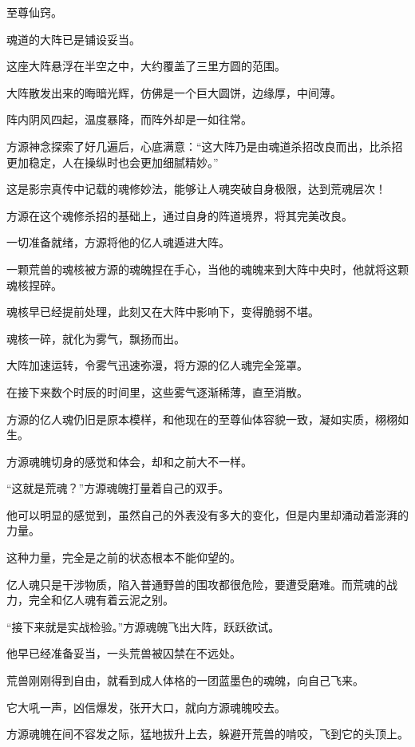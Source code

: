 
\begin{this_body}

至尊仙窍。

魂道的大阵已是铺设妥当。

这座大阵悬浮在半空之中，大约覆盖了三里方圆的范围。

大阵散发出来的晦暗光辉，仿佛是一个巨大圆饼，边缘厚，中间薄。

阵内阴风四起，温度暴降，而阵外却是一如往常。

方源神念探索了好几遍后，心底满意：“这大阵乃是由魂道杀招改良而出，比杀招更加稳定，人在操纵时也会更加细腻精妙。”

这是影宗真传中记载的魂修妙法，能够让人魂突破自身极限，达到荒魂层次！

方源在这个魂修杀招的基础上，通过自身的阵道境界，将其完美改良。

一切准备就绪，方源将他的亿人魂遁进大阵。

一颗荒兽的魂核被方源的魂魄捏在手心，当他的魂魄来到大阵中央时，他就将这颗魂核捏碎。

魂核早已经提前处理，此刻又在大阵中影响下，变得脆弱不堪。

魂核一碎，就化为雾气，飘扬而出。

大阵加速运转，令雾气迅速弥漫，将方源的亿人魂完全笼罩。

在接下来数个时辰的时间里，这些雾气逐渐稀薄，直至消散。

方源的亿人魂仍旧是原本模样，和他现在的至尊仙体容貌一致，凝如实质，栩栩如生。

方源魂魄切身的感觉和体会，却和之前大不一样。

“这就是荒魂？”方源魂魄打量着自己的双手。

他可以明显的感觉到，虽然自己的外表没有多大的变化，但是内里却涌动着澎湃的力量。

这种力量，完全是之前的状态根本不能仰望的。

亿人魂只是干涉物质，陷入普通野兽的围攻都很危险，要遭受磨难。而荒魂的战力，完全和亿人魂有着云泥之别。

“接下来就是实战检验。”方源魂魄飞出大阵，跃跃欲试。

他早已经准备妥当，一头荒兽被囚禁在不远处。

荒兽刚刚得到自由，就看到成人体格的一团蓝墨色的魂魄，向自己飞来。

它大吼一声，凶信爆发，张开大口，就向方源魂魄咬去。

方源魂魄在间不容发之际，猛地拔升上去，躲避开荒兽的啃咬，飞到它的头顶上。


\end{this_body}
